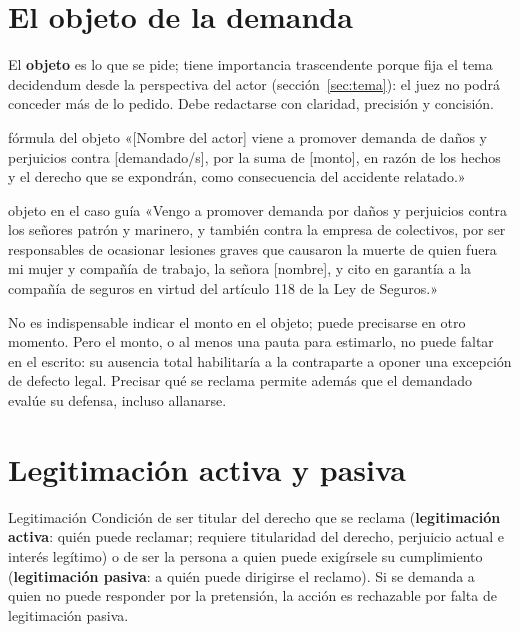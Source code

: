 \documentclass[12pt,oneside]{book}
\begin{document}
\section{El objeto de la demanda}

El \textbf{objeto} es lo que se pide; tiene importancia trascendente porque fija el tema decidendum desde la perspectiva del actor (sección~\ref{sec:tema}): el juez no podrá conceder más de lo pedido. Debe redactarse con claridad, precisión y concisión.

\begin{regla}{fórmula del objeto}
«[Nombre del actor] viene a promover demanda de daños y perjuicios contra [demandado/s], por la suma de [monto], en razón de los hechos y el derecho que se expondrán, como consecuencia del accidente relatado.»
\end{regla}

\begin{ejemplo}{objeto en el caso guía}
«Vengo a promover demanda por daños y perjuicios contra los señores patrón y marinero, y también contra la empresa de colectivos, por ser responsables de ocasionar lesiones graves que causaron la muerte de quien fuera mi mujer y compañía de trabajo, la señora [nombre], y cito en garantía a la compañía de seguros en virtud del artículo 118 de la Ley de Seguros.»
\end{ejemplo}

\begin{importante}
No es indispensable indicar el monto en el objeto; puede precisarse en otro momento. Pero el monto, o al menos una pauta para estimarlo, no puede faltar en el escrito: su ausencia total habilitaría a la contraparte a oponer una excepción de defecto legal. Precisar qué se reclama permite además que el demandado evalúe su defensa, incluso allanarse.
\end{importante}

\section{Legitimación activa y pasiva}

\begin{definicion}{Legitimación}
Condición de ser titular del derecho que se reclama (\textbf{legitimación activa}: quién puede reclamar; requiere titularidad del derecho, perjuicio actual e interés legítimo) o de ser la persona a quien puede exigírsele su cumplimiento (\textbf{legitimación pasiva}: a quién puede dirigirse el reclamo). Si se demanda a quien no puede responder por la pretensión, la acción es rechazable por falta de legitimación pasiva.
\end{definicion}
\end{document}
